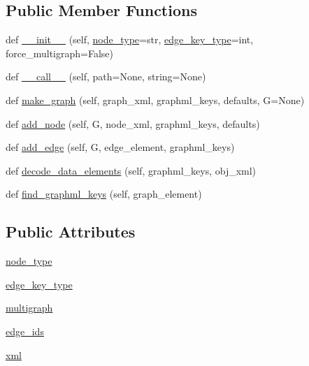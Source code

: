 \subsection*{Public Member Functions}
\begin{DoxyCompactItemize}
\item 
def \hyperlink{classnetworkx_1_1readwrite_1_1graphml_1_1GraphMLReader_a756b1c25522fb085a0347965c51d2408}{\+\_\+\+\_\+init\+\_\+\+\_\+} (self, \hyperlink{classnetworkx_1_1readwrite_1_1graphml_1_1GraphMLReader_ad620d46e7dc0ad416f9219fcc2d3acf8}{node\+\_\+type}=str, \hyperlink{classnetworkx_1_1readwrite_1_1graphml_1_1GraphMLReader_af4e6ae7fc857e3fd6613a28628b021fe}{edge\+\_\+key\+\_\+type}=int, force\+\_\+multigraph=False)
\item 
def \hyperlink{classnetworkx_1_1readwrite_1_1graphml_1_1GraphMLReader_a3d90d4aa678f271c4181011c867bd4bc}{\+\_\+\+\_\+call\+\_\+\+\_\+} (self, path=None, string=None)
\item 
def \hyperlink{classnetworkx_1_1readwrite_1_1graphml_1_1GraphMLReader_a08bdae7ad05a12452eb2b688ac2c85a3}{make\+\_\+graph} (self, graph\+\_\+xml, graphml\+\_\+keys, defaults, G=None)
\item 
def \hyperlink{classnetworkx_1_1readwrite_1_1graphml_1_1GraphMLReader_aa13535e05c406b959a0100425d5d3482}{add\+\_\+node} (self, G, node\+\_\+xml, graphml\+\_\+keys, defaults)
\item 
def \hyperlink{classnetworkx_1_1readwrite_1_1graphml_1_1GraphMLReader_a5f123d9add76a4d4deb84c9a29f5912d}{add\+\_\+edge} (self, G, edge\+\_\+element, graphml\+\_\+keys)
\item 
def \hyperlink{classnetworkx_1_1readwrite_1_1graphml_1_1GraphMLReader_ae086537e3e8d692a1fdb77e768cf83ad}{decode\+\_\+data\+\_\+elements} (self, graphml\+\_\+keys, obj\+\_\+xml)
\item 
def \hyperlink{classnetworkx_1_1readwrite_1_1graphml_1_1GraphMLReader_a2345656849daa060eac22952a1977701}{find\+\_\+graphml\+\_\+keys} (self, graph\+\_\+element)
\end{DoxyCompactItemize}
\subsection*{Public Attributes}
\begin{DoxyCompactItemize}
\item 
\hyperlink{classnetworkx_1_1readwrite_1_1graphml_1_1GraphMLReader_ad620d46e7dc0ad416f9219fcc2d3acf8}{node\+\_\+type}
\item 
\hyperlink{classnetworkx_1_1readwrite_1_1graphml_1_1GraphMLReader_af4e6ae7fc857e3fd6613a28628b021fe}{edge\+\_\+key\+\_\+type}
\item 
\hyperlink{classnetworkx_1_1readwrite_1_1graphml_1_1GraphMLReader_af494d18442bcec8ab3678400189c3ddd}{multigraph}
\item 
\hyperlink{classnetworkx_1_1readwrite_1_1graphml_1_1GraphMLReader_a9f985a28328aa02403238c36c2fbcf0b}{edge\+\_\+ids}
\item 
\hyperlink{classnetworkx_1_1readwrite_1_1graphml_1_1GraphMLReader_ad7f9c068c88d3b8e9330eb400e52e8c2}{xml}
\end{DoxyCompactItemize}
